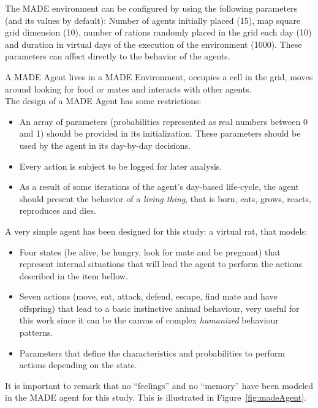 \documentclass[letterpaper]{article}
\begin{document}
The MADE environment can be configured by using the following parameters (and its values by default): Number of agents initially placed (15), map square grid dimension (10), number of rations randomly placed in the grid each day (10) and duration in virtual days of the  execution of the environment (1000). These parameters can affect directly to the behavior of the agents.



A MADE Agent lives in a MADE Environment, occupies a cell in the grid, moves around looking for food or mates and interacts with other agents.\\

The design of a MADE Agent has some restrictions:
\begin{itemize}
\item An array of parameters (probabilities represented as real numbers between 0 and 1) should be provided in its initialization. These parameters should be used by the agent in its day-by-day decisions.
\item Every action is subject to be logged for later analysis.
\item As a result of some iterations of the agent's day-based life-cycle, the agent should present the behavior of a \textit{living thing}, that is born, eats, grows, reacts, reproduces and dies.  
\end{itemize}

A very simple agent has been designed for this study: a virtual
rat, that models:
\begin{itemize}
\item Four states (be alive, be hungry, look for
mate and be pregnant) that represent internal situations that will lead the
agent to perform the actions described in the item bellow. %
\item Seven actions (move, eat, attack, defend, escape,
find mate and have offspring) that lead to a basic instinctive animal
behaviour, very useful for this work since it can be the canvas of 
complex \textit{humanized} behaviour patterns.
\item Parameters that define the characteristics and probabilities to
perform actions depending on the state.
\end{itemize}
It is important to remark that no ``feelings'' and no ``memory''
have been modeled in the MADE agent for this study. This is
illustrated in Figure~\ref{fig:madeAgent}.
\end{document}
